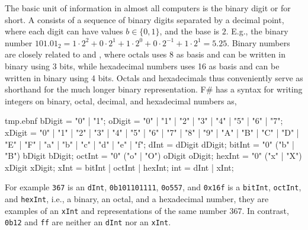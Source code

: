 The basic unit of information in almost all computers is the binary digit or  for short. A  consists of a sequence of binary digits separated by a decimal point, where each digit can have values $b \in \{0,1\}$, and the base is $2$. E.g., the binary number $101.01_2 = 1\cdot 2^2+0\cdot 2^1+1\cdot 2^0+0\cdot 2^{-1}+1\cdot 2^1=5.25$. Binary numbers are closely related to  and , where octals uses 8 as basis and can be written in binary using 3 bits, while hexadecimal numbers uses 16 as basis and can be written in binary using 4 bits. Octals and hexadecimals thus conveniently serve as shorthand for the much longer binary representation. F\# has a syntax for writing integers on binary, octal, decimal, and hexadecimal numbers as,
%
\begin{verbatimwrite}{tmp.ebnf}
bDigit = "0" | "1";
oDigit = "0" | "1" | "2" | "3" | "4" | "5" | "6" | "7";
xDigit =  
  "0" | "1" | "2" | "3" | "4" | "5" | "6" | "7" | "8" | "9"
  | "A" | "B" | "C" | "D" | "E" | "F" | "a" | "b" | "c" | "d" | "e" | "f";
dInt = dDigit {dDigit};
bitInt = "0" ("b" | "B") bDigit {bDigit};
octInt = "0" ("o" | "O") oDigit {oDigit};
hexInt = "0" ("x" | "X") xDigit {xDigit};
xInt = bitInt | octInt | hexInt;
int = dInt | xInt;
\end{verbatimwrite}
%
For example \lstinline!367! is an \lstinline[language=ebnf]!dInt!, \lstinline!0b101101111!, \lstinline!0o557!, and \lstinline!0x16f! is a \lstinline[language=ebnf]!bitInt!, \lstinline[language=ebnf]!octInt!, and \lstinline[language=ebnf]!hexInt!, i.e., a binary, an octal, and a hexadecimal number, they are examples of an \lstinline[language=ebnf]!xInt! and representations of the same number 367. In contrast, \lstinline!0b12! and \lstinline!ff! are neither an \lstinline[language=ebnf]!dInt! nor an \lstinline[language=ebnf]!xInt!.

